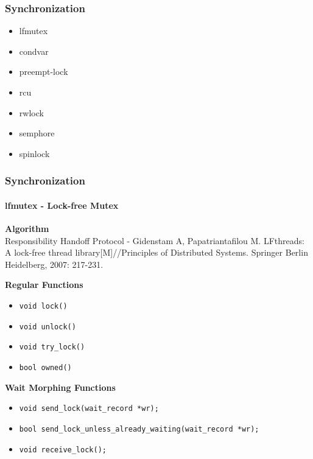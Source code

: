 \documentclass[10pt]{beamer}
\begin{document}
\begin{frame}
	\frametitle{Synchronization}
	\begin{itemize}
		\item lfmutex
		\item condvar
		\item preempt-lock
		\item rcu
		\item rwlock
		\item semphore
		\item spinlock
	\end{itemize}
\end{frame}

\begin{frame}
	\frametitle{Synchronization}
	\framesubtitle{lfmutex - Lock-free Mutex}
	
	\textbf{Algorithm} \\
	Responsibility Handoff Protocol - Gidenstam A, Papatriantafilou M. LFthreads: A lock-free thread library[M]//Principles of Distributed Systems. Springer Berlin Heidelberg, 2007: 217-231.

	\smallskip
	
	\textbf{Regular Functions}
	\begin{itemize}
		\item \texttt{void lock()}
		\item \texttt{void unlock()}
		\item \texttt{void try\_lock()}
		\item \texttt{bool owned()}
	\end{itemize}
	
	\smallskip
	
	\textbf{Wait Morphing Functions}
	\begin{itemize}
		\item \texttt{void send\_lock(wait\_record *wr);}
		\item \texttt{bool send\_lock\_unless\_already\_waiting(wait\_record *wr);}
		\item \texttt{void receive\_lock();}
	\end{itemize}
	
\end{frame}
\end{document}
